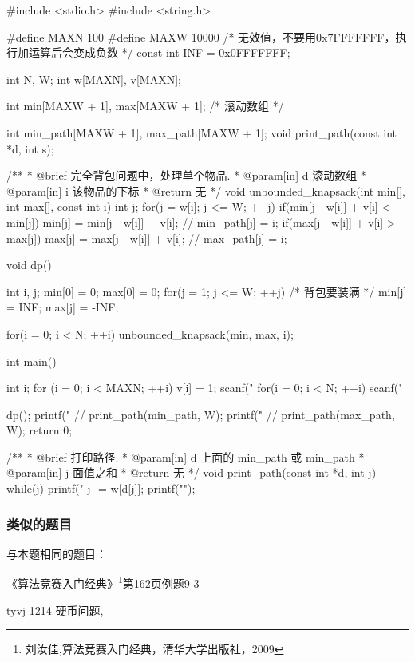 \begin{Codex}[label=coin_change3.c]
#include <stdio.h>
#include <string.h>

#define MAXN 100
#define MAXW 10000
 /* 无效值，不要用0x7FFFFFFF，执行加运算后会变成负数 */
const int INF = 0x0FFFFFFF;

int N, W;
int w[MAXN], v[MAXN];

int min[MAXW + 1], max[MAXW + 1]; /* 滚动数组 */

int min_path[MAXW + 1], max_path[MAXW + 1];
void print_path(const int *d, int s);

/**
 * @brief 完全背包问题中，处理单个物品.
 * @param[in] d 滚动数组
 * @param[in] i 该物品的下标
 * @return 无
 */
void unbounded_knapsack(int min[], int max[], const int i) {
    int j;
    for(j = w[i]; j <= W; ++j) {
        if(min[j - w[i]] + v[i] < min[j]) {
            min[j] = min[j - w[i]] + v[i];
            // min_path[j] = i;
        }
        if(max[j - w[i]] + v[i] > max[j]) {
            max[j] = max[j - w[i]] + v[i];
            // max_path[j] = i;
        }
    }
}

void dp() {
    int i, j;
    min[0] = 0;
    max[0] = 0;
    for(j = 1; j <= W; ++j) { /* 背包要装满 */
        min[j] = INF;
        max[j] = -INF;
    }

    for(i = 0; i < N; ++i) unbounded_knapsack(min, max, i);
}

int main() {
    int i;
    for (i = 0; i < MAXN; ++i) v[i] = 1;
    scanf("%
    for(i = 0; i < N; ++i) scanf("%

    dp();
    printf("%
    // print_path(min_path, W);
    printf("%
    // print_path(max_path, W);
    return 0;
}

/**
 * @brief 打印路径.
 * @param[in] d 上面的 min_path 或 min_path
 * @param[in] j 面值之和
 * @return 无
 */
void print_path(const int *d, int j) {
    while(j) {
        printf("%
        j -= w[d[j]];
    }
    printf("\n");
}
\end{Codex}

\subsubsection{类似的题目}
与本题相同的题目：
\begindot
\item 《算法竞赛入门经典》\footnote{刘汝佳,算法竞赛入门经典，清华大学出版社，2009}第162页例题9-3
\item  tyvj 1214 硬币问题, 
\myenddot

